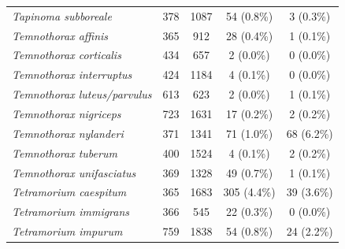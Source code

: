 \documentclass[preprint,final,times,12pt,3p]{elsarticle}
\begin{document}
\begin{longtable}{ l c c c c}
	\emph{Tapinoma subboreale} & 378 & 1087 & 54 (0.8\%) & 3 (0.3\%) \\
	\emph{Temnothorax affinis} & 365 & 912 & 28 (0.4\%) & 1 (0.1\%) \\
	\emph{Temnothorax corticalis} & 434 & 657 & 2 (0.0\%) & 0 (0.0\%) \\
	\emph{Temnothorax interruptus} & 424 & 1184 & 4 (0.1\%) & 0 (0.0\%) \\
	\emph{Temnothorax luteus/parvulus} & 613 & 623 & 2 (0.0\%) & 1 (0.1\%) \\
	\emph{Temnothorax nigriceps} & 723 & 1631 & 17 (0.2\%) & 2 (0.2\%) \\
	\emph{Temnothorax nylanderi} & 371 & 1341 & 71 (1.0\%) & 68 (6.2\%) \\
	\emph{Temnothorax tuberum} & 400 & 1524 & 4 (0.1\%) & 2 (0.2\%) \\
	\emph{Temnothorax unifasciatus} & 369 & 1328 & 49 (0.7\%) & 1 (0.1\%) \\
	\emph{Tetramorium caespitum} & 365 & 1683 & 305 (4.4\%) & 39 (3.6\%) \\
	\emph{Tetramorium immigrans} & 366 & 545 & 22 (0.3\%) & 0 (0.0\%) \\
	\emph{Tetramorium impurum} & 759 & 1838 & 54 (0.8\%) & 24 (2.2\%) \\
\end{longtable}
\endgroup


\newpage
\end{document}
